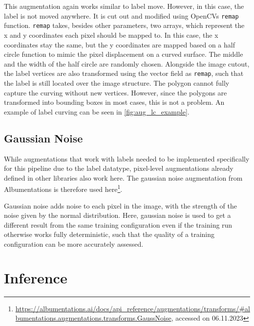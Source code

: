 \documentclass[10pt]{book}
\newcommand{\figureref}[1]{\autoref{#1}}
\begin{document}
This augmentation again works similar to label move. However, in this case, the label is not moved anywhere. It is cut out and modified using \acp{OpenCV} \texttt{remap} function. \texttt{remap} takes, besides other parameters, two arrays, which represent the x and y coordinates each pixel should be mapped to. In this case, the x coordinates stay the same, but the y coordinates are mapped based on a half circle function to mimic the pixel displacement on a curved surface. The middle and the width of the half circle are randomly chosen. Alongside the image cutout, the label vertices are also transformed using the vector field as \texttt{remap}, such that the label is still located over the image structure. The polygon cannot fully capture the curving without new vertices. However, since the polygons are transformed into bounding boxes in most cases, this is not a problem. An example of label curving can be seen in \figureref{fig:aug_lc_example}.

\subsection{Gaussian Noise}

While augmentations that work with labels needed to be implemented specifically for this pipeline due to the label datatype, pixel-level augmentations already defined in other libraries also work here. The gaussian noise augmentation from Albumentations is therefore used here\footnote{\url{https://albumentations.ai/docs/api\_reference/augmentations/transforms/\#albumentations.augmentations.transforms.GaussNoise}, accessed on 06.11.2023}. 

Gaussian noise adds noise to each pixel in the image, with the strength of the noise given by the normal distribution. Here, gaussian noise is used to get a different result from the same training configuration even if the training run otherwise works fully deterministic, such that the quality of a training configuration can be more accurately assessed.


\section{Inference}
\end{document}
